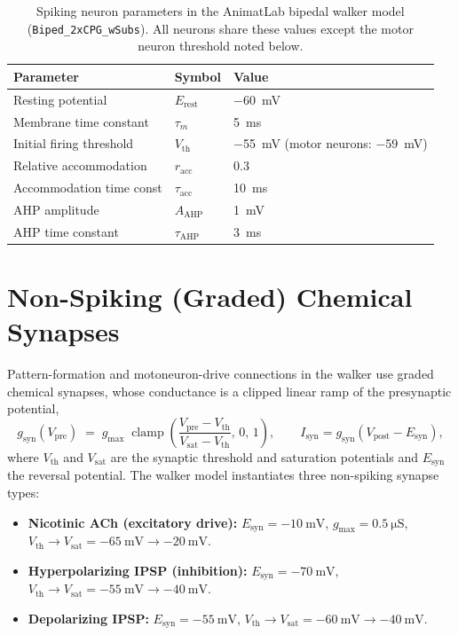 \begin{table}[htbp]
\caption{Spiking neuron parameters in the AnimatLab bipedal walker model
(\texttt{Biped\_2xCPG\_wSubs}). All neurons share these values except the motor
neuron threshold noted below.}
\label{tab:app_neuron}
\begin{tabular}{@{}lll@{}}
\toprule
\textbf{Parameter} & \textbf{Symbol} & \textbf{Value} \\
\midrule
Resting potential        & $E_{\text{rest}}$   & \qty{-60}{\mV} \\
Membrane time constant   & $\tau_{m}$          & \qty{5}{\ms}   \\
Initial firing threshold & $V_{\text{th}}$     & \qty{-55}{\mV} (motor neurons: \qty{-59}{\mV}) \\
Relative accommodation   & $r_{\text{acc}}$    & 0.3            \\
Accommodation time const & $\tau_{\text{acc}}$ & \qty{10}{\ms}  \\
AHP amplitude            & $A_{\text{AHP}}$    & \qty{1}{\mV}   \\
AHP time constant        & $\tau_{\text{AHP}}$ & \qty{3}{\ms}   \\
\bottomrule
\end{tabular}
\end{table}

\section{Non-Spiking (Graded) Chemical Synapses}

Pattern-formation and motoneuron-drive connections in the walker use graded chemical synapses, whose conductance is a clipped linear ramp of the presynaptic potential,
\begin{equation}
    g_{\text{syn}}(V_{\text{pre}})
    \;=\; g_{\text{max}}\;
    \operatorname{clamp}\!\left(
        \frac{V_{\text{pre}} - V_{\text{th}}}{V_{\text{sat}} - V_{\text{th}}},
        \,0,\,1\right),
    \qquad
    I_{\text{syn}} = g_{\text{syn}}\left(V_{\text{post}} - E_{\text{syn}}\right),
    \label{eq:app_nonsyn}
\end{equation}
where $V_{\text{th}}$ and $V_{\text{sat}}$ are the synaptic threshold and saturation potentials and $E_{\text{syn}}$ the reversal potential. The walker model instantiates three non-spiking synapse types:

\begin{itemize}
    \item \textbf{Nicotinic ACh (excitatory drive):}
          $E_{\text{syn}} = \qty{-10}{\mV}$,
          $g_{\text{max}} = \qty{0.5}{\micro\siemens}$,
          $V_{\text{th}} \to V_{\text{sat}} = \qty{-65}{\mV} \to \qty{-20}{\mV}$.
    \item \textbf{Hyperpolarizing IPSP (inhibition):}
          $E_{\text{syn}} = \qty{-70}{\mV}$,
          $V_{\text{th}} \to V_{\text{sat}} = \qty{-55}{\mV} \to \qty{-40}{\mV}$.
    \item \textbf{Depolarizing IPSP:}
          $E_{\text{syn}} = \qty{-55}{\mV}$,
          $V_{\text{th}} \to V_{\text{sat}} = \qty{-60}{\mV} \to \qty{-40}{\mV}$.
\end{itemize}

